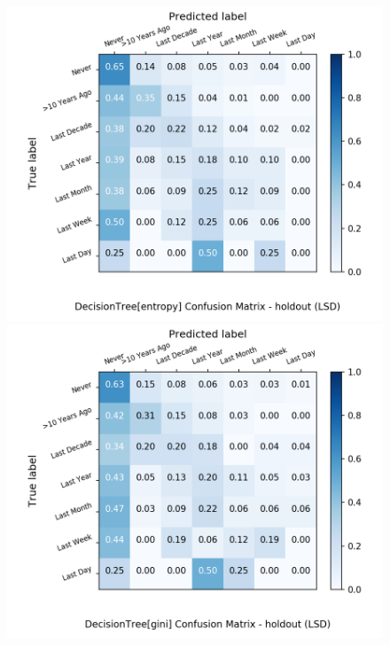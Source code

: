 \begin{figure}[H]
	\centering
	\begin{minipage}[b]{0.32\textwidth}
		\includegraphics[width=1.1\textwidth]{Plots/LSD_DecisionTree_entropy_balance_False_holdout.png}
	\end{minipage}
	\begin{minipage}[b]{0.32\textwidth}
		\includegraphics[width=1.1\textwidth]{Plots/LSD_DecisionTree_gini_balance_False_holdout.png}
	\end{minipage}
	\begin{minipage}[b]{0.32\textwidth}

\end{minipage}
\end{figure}
